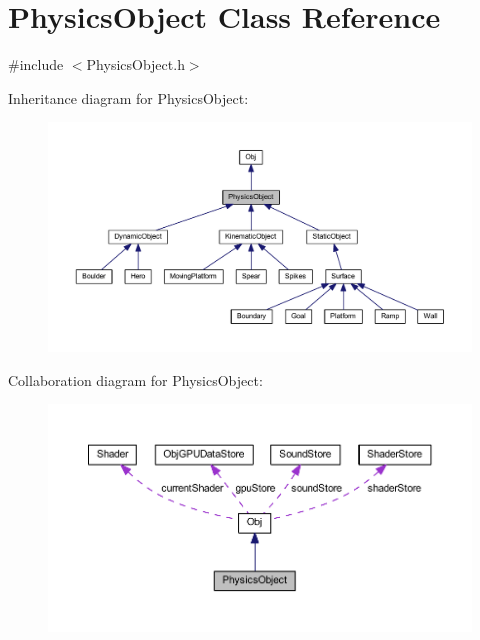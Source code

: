\hypertarget{class_physics_object}{}\section{Physics\+Object Class Reference}
\label{class_physics_object}


{\ttfamily \#include $<$Physics\+Object.\+h$>$}



Inheritance diagram for Physics\+Object\+:
\nopagebreak
\begin{figure}[H]
\begin{center}
\leavevmode
\includegraphics[width=350pt]{class_physics_object__inherit__graph}
\end{center}
\end{figure}


Collaboration diagram for Physics\+Object\+:
\nopagebreak
\begin{figure}[H]
\begin{center}
\leavevmode
\includegraphics[width=350pt]{class_physics_object__coll__graph}
\end{center}
\end{figure}
